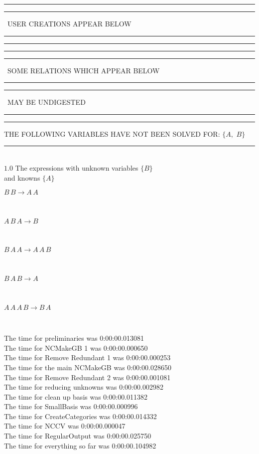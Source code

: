 \documentclass[rep10,leqno]{report}
\begin{document}
\rule[2pt]{6in}{1pt}\hfil\break
\rule[2.5pt]{1.701in}{1pt}
\ USER CREATIONS APPEAR BELOW\ 
\rule[2.5pt]{1.701in}{1pt}\hfil\break
\rule[2pt]{6in}{1pt}\hfil\break
\rule[2pt]{6in}{4pt}\hfil\break
\rule[2pt]{1.45in}{4pt}
\ SOME RELATIONS WHICH APPEAR BELOW\ 
\rule[2pt]{1.45in}{4pt}\hfil\break
\rule[2pt]{2.18in}{4pt}
\ MAY BE UNDIGESTED\ 
\rule[2pt]{2.18in}{4pt}\hfil\break
\rule[2pt]{6in}{4pt}\hfil\break
THE FOLLOWING VARIABLES HAVE NOT BEEN SOLVED FOR:\hfil\break
$\{A,
$ $
B\}$
\smallskip\\
\rule[3pt]{6in}{.7pt}\\
$1.0$  The expressions with unknown variables $\{B\}$\\
and knowns $\{A\}$\smallskip\\
\begin{minipage}{6in}
$
B\,
 B\rightarrow A\,
 A
$
\end{minipage}\medskip \\
\begin{minipage}{6in}
$
A\,
 B\,
 A\rightarrow B
$
\end{minipage}\medskip \\
\begin{minipage}{6in}
$
B\,
 A\,
 A\rightarrow A\,
 A\,
 B
$
\end{minipage}\medskip \\
\begin{minipage}{6in}
$
B\,
 A\,
 B\rightarrow A
$
\end{minipage}\medskip \\
\begin{minipage}{6in}
$
A\,
 A\,
 A\,
 B\rightarrow B\,
 A
$
\end{minipage}\\
\vspace{10pt}

\noindent
The time for preliminaries was 0:00:00.013081\\
The time for NCMakeGB 1 was 0:00:00.000650\\
The time for Remove Redundant 1 was 0:00:00.000253\\
The time for the main NCMakeGB was 0:00:00.028650\\
The time for Remove Redundant 2 was 0:00:00.001081\\
The time for reducing unknowns was 0:00:00.002982\\
The time for clean up basis was 0:00:00.011382\\
The time for SmallBasis was 0:00:00.000996\\
The time for CreateCategories was 0:00:00.014332\\
The time for NCCV was 0:00:00.000047\\
The time for RegularOutput was 0:00:00.025750\\
The time for everything so far was 0:00:00.104982\\
\end{document}
